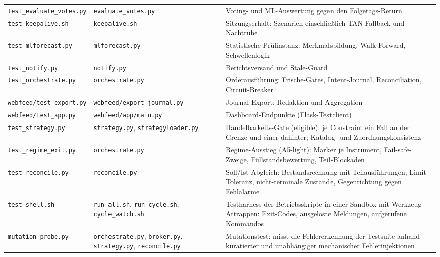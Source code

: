 \begin{longtable}{@{}p{}p{}p{}@{}}
  \texttt{test\_\allowbreak evaluate\_\allowbreak votes.py} & \texttt{evaluate\_\allowbreak votes.py} & Voting- und ML-Auswertung gegen den Folgetags-Return \\
  \texttt{test\_\allowbreak keepalive.sh} & \texttt{keepalive.sh} & Sitzungserhalt: Szenarien einschließlich TAN-Fallback und Nachtruhe \\
  \texttt{test\_\allowbreak mlforecast.py} & \texttt{mlforecast.py} & Statistische Prüfinstanz: Merkmalsbildung, Walk-Forward, Schwellenlogik \\
  \texttt{test\_\allowbreak notify.py} & \texttt{notify.py} & Berichtsversand und Stale-Guard \\
  \texttt{test\_\allowbreak orchestrate.py} & \texttt{orchestrate.py} & Orderausführung: Frische-Gates, Intent-Journal, Reconciliation, Circuit-Breaker \\
  \texttt{webfeed/\allowbreak test\_\allowbreak export.py} & \texttt{webfeed/\allowbreak export\_\allowbreak journal.py} & Journal-Export: Redaktion und Aggregation \\
  \texttt{webfeed/\allowbreak test\_\allowbreak app.py} & \texttt{webfeed/\allowbreak app/\allowbreak main.py} & Dashboard-Endpunkte (Flask-Testclient) \\
  \texttt{test\_\allowbreak strategy.py} & \texttt{strategy.py}, \texttt{strategyloader.py} & Handelbarkeits-Gate (eligible): je Constraint ein Fall an der Grenze und einer dahinter; Katalog- und Zuordnungskonsistenz \\
  \texttt{test\_\allowbreak regime\_\allowbreak exit.py} & \texttt{orchestrate.py} & Regime-Ausstieg (A5-light): Marker je Instrument, Fail-safe-Zweige, Füllstandsbewertung, Teil-Blockaden \\
  \texttt{test\_\allowbreak reconcile.py} & \texttt{reconcile.py} & Soll/Ist-Abgleich: Bestandsrechnung mit Teilausführungen, Limit-Toleranz, nicht-terminale Zustände, Gegenrichtung gegen Fehlalarme \\
  \texttt{test\_\allowbreak shell.sh} & \texttt{run\_\allowbreak all.sh}, \texttt{run\_\allowbreak cycle.sh}, \texttt{cycle\_\allowbreak watch.sh} & Testharness der Betriebsskripte in einer Sandbox mit Werkzeug-Attrappen: Exit-Codes, ausgelöste Meldungen, aufgerufene Kommandos \\
  \texttt{mutation\_\allowbreak probe.py} & \texttt{orchestrate.py}, \texttt{broker.py}, \texttt{strategy.py}, \texttt{reconcile.py} & Mutationstest: misst die Fehlererkennung der Testsuite anhand kuratierter und unabhängiger mechanischer Fehlerinjektionen \\

\end{longtable}
